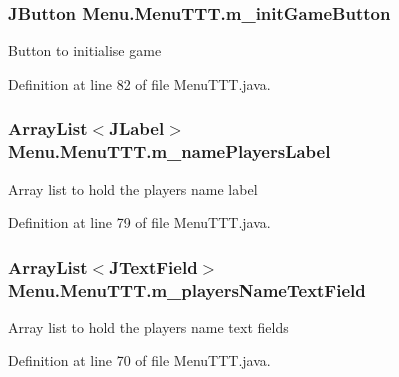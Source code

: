 \subsubsection[{m\+\_\+init\+Game\+Button}]{\setlength{\rightskip}{0pt plus 5cm}J\+Button Menu.\+Menu\+T\+T\+T.\+m\+\_\+init\+Game\+Button\hspace{0.3cm}{\ttfamily [private]}}\label{class_menu_1_1_menu_t_t_t_a59b7acc44f8e856bd54c46a8c81b1990}
Button to initialise game 

Definition at line 82 of file Menu\+T\+T\+T.\+java.

\hypertarget{class_menu_1_1_menu_t_t_t_a3a18e1c57089dedf1bdb8808affb405b}{}
\subsubsection[{m\+\_\+name\+Players\+Label}]{\setlength{\rightskip}{0pt plus 5cm}Array\+List$<$J\+Label$>$ Menu.\+Menu\+T\+T\+T.\+m\+\_\+name\+Players\+Label\hspace{0.3cm}{\ttfamily [private]}}\label{class_menu_1_1_menu_t_t_t_a3a18e1c57089dedf1bdb8808affb405b}
Array list to hold the players name label 

Definition at line 79 of file Menu\+T\+T\+T.\+java.

\hypertarget{class_menu_1_1_menu_t_t_t_a2398e606664e494a0bfd92cd4990404f}{}
\subsubsection[{m\+\_\+players\+Name\+Text\+Field}]{\setlength{\rightskip}{0pt plus 5cm}Array\+List$<$J\+Text\+Field$>$ Menu.\+Menu\+T\+T\+T.\+m\+\_\+players\+Name\+Text\+Field\hspace{0.3cm}{\ttfamily [private]}}\label{class_menu_1_1_menu_t_t_t_a2398e606664e494a0bfd92cd4990404f}
Array list to hold the player\textquotesingle{}s name text fields 

Definition at line 70 of file Menu\+T\+T\+T.\+java.

\hypertarget{class_menu_1_1_menu_t_t_t_a1f431306714855f214aacab632031a23}{}
